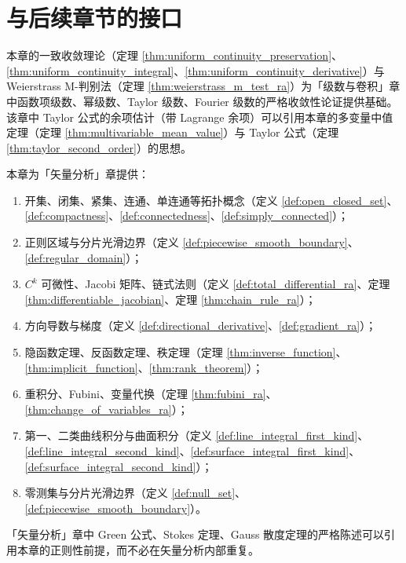 \section{与后续章节的接口}

\begin{remark}\label{rem:ra_to_series}
本章的一致收敛理论（定理 \ref{thm:uniform_continuity_preservation}、\ref{thm:uniform_continuity_integral}、\ref{thm:uniform_continuity_derivative}）与 Weierstrass M-判别法（定理 \ref{thm:weierstrass_m_test_ra}）为「级数与卷积」章中函数项级数、幂级数、Taylor 级数、Fourier 级数的严格收敛性论证提供基础。该章中 Taylor 公式的余项估计（带 Lagrange 余项）可以引用本章的多变量中值定理（定理 \ref{thm:multivariable_mean_value}）与 Taylor 公式（定理 \ref{thm:taylor_second_order}）的思想。
\end{remark}

\begin{remark}\label{rem:ra_to_vector_analysis}
本章为「矢量分析」章提供：
\begin{enumerate}[label=(\roman*)]
    \item 开集、闭集、紧集、连通、单连通等拓扑概念（定义 \ref{def:open_closed_set}、\ref{def:compactness}、\ref{def:connectedness}、\ref{def:simply_connected}）；
    \item 正则区域与分片光滑边界（定义 \ref{def:piecewise_smooth_boundary}、\ref{def:regular_domain}）；
    \item $C^k$ 可微性、Jacobi 矩阵、链式法则（定义 \ref{def:total_differential_ra}、定理 \ref{thm:differentiable_jacobian}、定理 \ref{thm:chain_rule_ra}）；
    \item 方向导数与梯度（定义 \ref{def:directional_derivative}、\ref{def:gradient_ra}）；
    \item 隐函数定理、反函数定理、秩定理（定理 \ref{thm:inverse_function}、\ref{thm:implicit_function}、\ref{thm:rank_theorem}）；
    \item 重积分、Fubini、变量代换（定理 \ref{thm:fubini_ra}、\ref{thm:change_of_variables_ra}）；
    \item 第一、二类曲线积分与曲面积分（定义 \ref{def:line_integral_first_kind}、\ref{def:line_integral_second_kind}、\ref{def:surface_integral_first_kind}、\ref{def:surface_integral_second_kind}）；
    \item 零测集与分片光滑边界（定义 \ref{def:null_set}、\ref{def:piecewise_smooth_boundary}）。
\end{enumerate}
「矢量分析」章中 Green 公式、Stokes 定理、Gauss 散度定理的严格陈述可以引用本章的正则性前提，而不必在矢量分析内部重复。
\end{remark}

